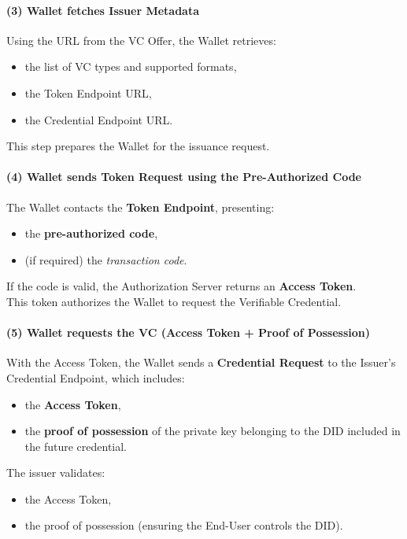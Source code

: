 \paragraph{(3) Wallet fetches Issuer Metadata}
Using the URL from the VC Offer, the Wallet retrieves:
\begin{itemize}
    \item the list of VC types and supported formats,
    \item the Token Endpoint URL,
    \item the Credential Endpoint URL.
\end{itemize}

\noindent
This step prepares the Wallet for the issuance request.

\paragraph{(4) Wallet sends Token Request using the Pre-Authorized Code}
The Wallet contacts the \textbf{Token Endpoint}, presenting:
\begin{itemize}
    \item the \textbf{pre-authorized code},
    \item (if required) the \emph{transaction code}.
\end{itemize}

\noindent
If the code is valid, the Authorization Server returns an \textbf{Access Token}. \\ 
This token authorizes the Wallet to request the Verifiable Credential.


\paragraph{(5) Wallet requests the VC (Access Token + Proof of Possession)}
With the Access Token, the Wallet sends a \textbf{Credential Request} to the Issuer’s Credential Endpoint, which includes:
\begin{itemize}
    \item the \textbf{Access Token},
    \item the \textbf{proof of possession} of the private key belonging to the DID included in the future credential.
\end{itemize}

\noindent
The issuer validates:
\begin{itemize}
    \item the Access Token,
    \item the proof of possession (ensuring the End-User controls the DID).
\end{itemize}

